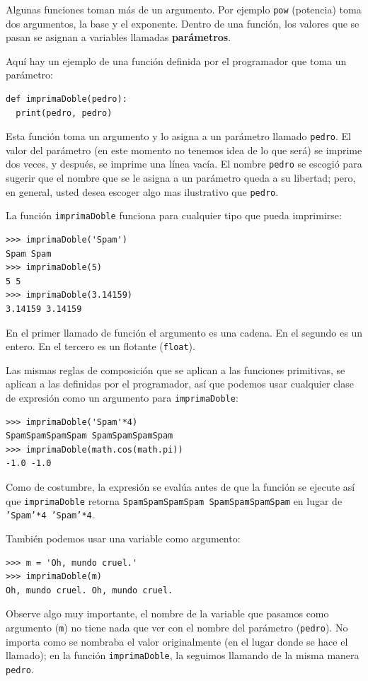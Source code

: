 Algunas funciones toman más de un argumento. Por ejemplo \texttt{pow}
(potencia) toma dos argumentos, la base y el exponente. Dentro de
una función, los valores que se pasan se asignan a variables llamadas
\textbf{parámetros}.

Aquí hay un ejemplo de una función definida por el programador que
toma un parámetro:

\begin{verbatim}
def imprimaDoble(pedro):
  print(pedro, pedro)
\end{verbatim}
 Esta función toma un argumento y lo asigna a un parámetro llamado
\texttt{pedro}. El valor del parámetro (en este momento no tenemos
idea de lo que será) se imprime dos veces, y después, se imprime una
línea vacía. El nombre \texttt{pedro} se escogió para sugerir que
el nombre que se le asigna a un parámetro queda a su libertad; pero,
en general, usted desea escoger algo mas ilustrativo que \texttt{pedro}.

La función \texttt{imprimaDoble} funciona para cualquier tipo que
pueda imprimirse:

\begin{verbatim}
>>> imprimaDoble('Spam')
Spam Spam
>>> imprimaDoble(5)
5 5
>>> imprimaDoble(3.14159)
3.14159 3.14159
\end{verbatim}
 En el primer llamado de función el argumento es una cadena. En el
segundo es un entero. En el tercero es un flotante (\texttt{float}).

Las mismas reglas de composición que se aplican a las funciones primitivas,
se aplican a las definidas por el programador, así que podemos usar
cualquier clase de expresión como un argumento para \texttt{imprimaDoble}:

\begin{verbatim}
>>> imprimaDoble('Spam'*4)
SpamSpamSpamSpam SpamSpamSpamSpam
>>> imprimaDoble(math.cos(math.pi))
-1.0 -1.0
\end{verbatim}
 Como de costumbre, la expresión se evalúa antes de que la función
se ejecute así que \texttt{imprimaDoble} retorna \texttt{SpamSpamSpamSpam
SpamSpamSpamSpam} en lugar de \texttt{'Spam'{*}4 'Spam'{*}4}.

También podemos usar una variable como argumento:

\begin{verbatim}
>>> m = 'Oh, mundo cruel.'
>>> imprimaDoble(m)
Oh, mundo cruel. Oh, mundo cruel.
\end{verbatim}
 Observe algo muy importante, el nombre de la variable que pasamos
como argumento (\texttt{m}) no tiene nada que ver con el nombre del
parámetro (\texttt{pedro}). No importa como se nombraba el valor originalmente
(en el lugar donde se hace el llamado); en la función \texttt{imprimaDoble},
la seguimos llamando de la misma manera \texttt{pedro}.

